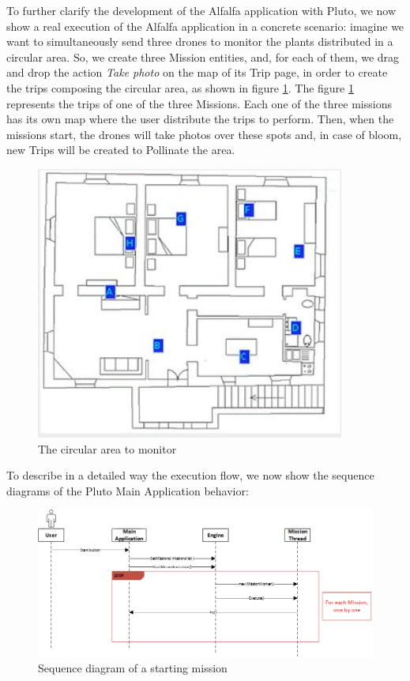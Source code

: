 To further clarify the development of the Alfalfa\cite{alfalfa} application with Pluto, we now show a real execution of the Alfalfa application in a concrete scenario:
imagine we want to simultaneously send three drones to monitor the plants distributed in a circular area.
So, we create three Mission entities, and, for each of them, we drag and drop the action \textit{Take photo} on the map of its Trip page, in order to create the trips composing the circular area, as shown in figure \ref{fig:alfalfaArea}.
The figure \ref{fig:alfalfaArea} represents the trips of one of the three Missions.
Each one of the three missions has its own map where the user distribute the trips to perform.
Then, when the missions start, the drones will take photos over these spots and, in case of bloom, new Trips will be created to Pollinate the area.
\\

\begin{figure}[h!]
  \centering
  \includegraphics[width=\linewidth,height=9cm]{pictures/alfalfaArea.png}
  \caption{The circular area to monitor}
  \label{fig:alfalfaArea}
\end{figure}

\newpage

To describe in a detailed way the execution flow, we now show the sequence diagrams of the Pluto Main Application behavior:
\\

\begin{figure}[h]
  \centering
  \includegraphics[width=\linewidth]{pictures/Alfalfa_Sequence_MissionStart.png}
  \caption{Sequence diagram of a starting mission}
  \label{fig:alfalfaSequence1}
\end{figure}

